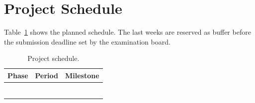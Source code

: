 \documentclass[11pt,a4paper]{article}
\begin{document}
\section{Project Schedule}
Table~\ref{tab:schedule} shows the planned schedule. The last weeks are
reserved as buffer before the submission deadline set by the examination
board.

\begin{table}[H]
  \centering
  \caption{Project schedule.}
  \label{tab:schedule}
  \begin{tabularx}{\textwidth}{@{}>{\raggedright}X>{\raggedright}p{3.6cm}>{\raggedright\arraybackslash}X@{}}
    \toprule
    \textbf{Phase} & \textbf{Period} & \textbf{Milestone} \\
    \midrule[\heavyrulewidth]
    \rule{0pt}{1.6em} & & \\ \midrule
    \rule{0pt}{1.6em} & & \\ \midrule
    \rule{0pt}{1.6em} & & \\ \midrule
    \rule{0pt}{1.6em} & & \\ \midrule
    \rule{0pt}{1.6em} & & \\ \midrule
    \rule{0pt}{1.6em} & & \\
    \bottomrule
  \end{tabularx}
\end{table}

\printbibliography
\end{document}
